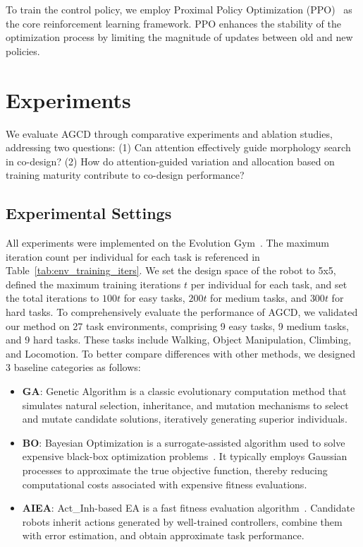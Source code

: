 \documentclass{article}
\begin{document}
    To train the control policy, we employ Proximal
    Policy Optimization (PPO)~\cite{schulman2017proximal} as the core reinforcement
    learning framework. PPO enhances the stability of the optimization process
    by limiting the magnitude of updates between old and new policies.

    \section{Experiments}
    We evaluate AGCD through comparative experiments and ablation studies,
    addressing two questions: (1) Can attention effectively guide morphology
    search in co-design? (2) How do attention-guided variation and allocation
    based on training maturity contribute to co-design performance?
    \subsection{Experimental Settings}
    All experiments were implemented on the Evolution Gym~\cite{bhatia2021evolution}.
    The maximum iteration count per individual for each task is referenced in Table~\ref{tab:env_training_iters}.
    We set the design space of the robot to 5x5, defined the maximum training iterations
    $t$ per individual for each task, and set the total iterations to $100t$ for
    easy tasks, $200t$ for medium tasks, and $300t$ for hard tasks. To comprehensively
    evaluate the performance of AGCD, we validated our method on 27 task
    environments, comprising 9 easy tasks, 9 medium tasks, and 9 hard tasks.
    These tasks include Walking, Object Manipulation, Climbing, and Locomotion.
    To better compare differences with other methods, we designed 3 baseline categories
    as follows:
    \begin{itemize}
        \item \textbf{GA}: Genetic Algorithm is a classic evolutionary computation
            method that simulates natural selection, inheritance, and mutation mechanisms
            to select and mutate candidate solutions, iteratively generating
            superior individuals.

        \item \textbf{BO}: Bayesian Optimization is a surrogate-assisted algorithm
            used to solve expensive black-box optimization problems~\cite{wang2023recent}.
            It typically employs Gaussian processes to approximate the true
            objective function, thereby reducing computational costs associated with
            expensive fitness evaluations.

        \item \textbf{AIEA}: Act\_Inh-based EA is a fast fitness evaluation algorithm~\cite{liu2023rapidly}.
            Candidate robots inherit actions generated by well-trained
            controllers, combine them with error estimation, and obtain
            approximate task performance.
    \end{itemize}
\end{document}
